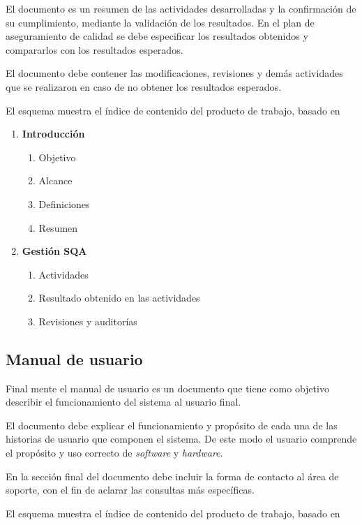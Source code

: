 El documento es un resumen de las actividades desarrolladas y la confirmación de su cumplimiento, mediante la validación de los resultados. En el plan de aseguramiento de calidad se debe especificar los resultados obtenidos y compararlos con los resultados esperados.

El documento debe contener las modificaciones, revisiones y demás actividades que se realizaron en caso de no obtener los resultados esperados.

El esquema muestra el índice de contenido del producto de trabajo, basado en \citet{mem00}

\begin{framed}
    \begin{enumerate}
		\item \textbf{Introducción}
		\begin{enumerate}
			\item Objetivo
			\item Alcance
			\item Definiciones
			\item Resumen
		\end{enumerate}
		\item \textbf{Gestión SQA}
		\begin{enumerate}
			\item Actividades
			\item Resultado obtenido en las actividades
			\item Revisiones y auditorías
		\end{enumerate}
	\end{enumerate}
\end{framed}

\subsection{Manual de usuario}
Final mente el manual de usuario es un documento que tiene como objetivo describir el funcionamiento del sistema al usuario final. 

El documento debe explicar el funcionamiento y propósito de cada una de las historias de usuario que componen el sistema. De este modo el usuario comprende el propósito y uso correcto de \emph{software} y \emph{hardware}.

En la sección final del documento debe incluir la forma de contacto al área de soporte, con el fin de aclarar las consultas más específicas.

El esquema muestra el índice de contenido del producto de trabajo, basado en \citet{mem00}

